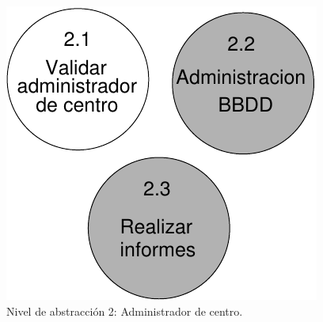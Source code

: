         \begin{figure}[!ht]
            \begin{center}
            \includegraphics[]{08.Analisis_Funcional/8.2.DFDs/Niveles/Diagramas/nivel2-2.pdf}
            \caption{Nivel de abstracción 2: Administrador de centro.}
            \label{diagramaNivel2-2}
            \end{center}
         \end{figure}